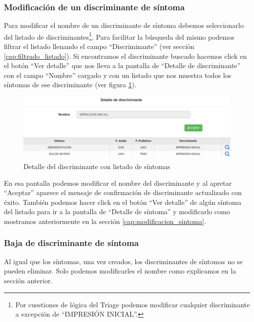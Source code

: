 \subsubsection{Modificación de un discriminante de síntoma}
Para modificar el nombre de un discriminante de síntoma debemos seleccionarlo del listado de discriminantes\footnote{Por cuestiones de lógica del Triage podemos modificar cualquier discriminante a excepción de ``IMPRESIÓN INICIAL''.}. Para facilitar la búsqueda del mismo podemos filtrar el listado llenando el campo ``Discriminante'' (ver sección \ref{cap:filtrado_listado}). Si encontramos el discriminante buscado hacemos click en el botón ``Ver detalle'' que nos lleva a la pantalla de ``Detalle de discriminante'' con el campo ``Nombre'' cargado y con un listado que nos muestra todos los síntomas de ese discriminante (ver figura \ref{fig:detalle_discriminante}).
\begin{figure}
\centerline{\includegraphics[width=1\textwidth]{listado_sintomas_de_discriminante.png}}
\caption{Detalle del discriminante con listado de síntomas}
\label{fig:detalle_discriminante}
\end{figure}
En esa pantalla podemos modificar el nombre del discriminante y al apretar ``Aceptar'' aparece el mensaje de confirmación de discriminante actualizado con éxito. También podemos hacer click en el botón ``Ver detalle'' de algún síntoma del listado para ir a la pantalla de ``Detalle de síntoma'' y modificarlo como mostramos anteriormente en la sección \ref{cap:modificacion_sintoma}.

\subsubsection{Baja de discriminante de síntoma}
Al igual que los síntomas, una vez creados, los discriminantes de síntomas no se pueden eliminar. Solo podemos modificarles el nombre como explicamos en la sección anterior.